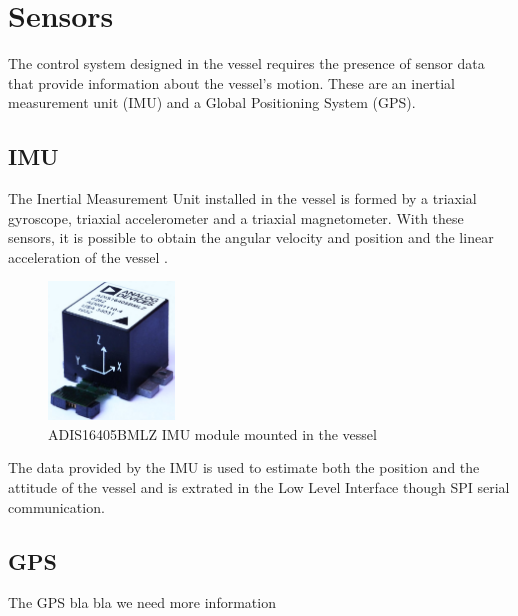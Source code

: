 \section{Sensors}

The control system designed in the vessel requires the presence of sensor data that provide information about the vessel's motion. These are an inertial measurement unit (IMU) and a Global Positioning System (GPS).

\subsection{IMU}

The Inertial Measurement Unit installed in the vessel is formed by a triaxial gyroscope, triaxial accelerometer and a triaxial magnetometer. With these sensors, it is possible to obtain the angular velocity and position and the linear acceleration of the vessel \cite{IMUDatasheet}. 
%
\begin{figure}[H]
	\includegraphics[width=0.3\textwidth]{figures/IMU}
	\caption{ADIS16405BMLZ IMU module mounted in the vessel \cite{IMUFigure}}
	\label{fig:IMU}
\end{figure}
%
The data provided by the IMU is used to estimate both the position and the attitude of the vessel and is extrated in the Low Level Interface though SPI serial communication.



\subsection{GPS}

The GPS bla bla we need more information


